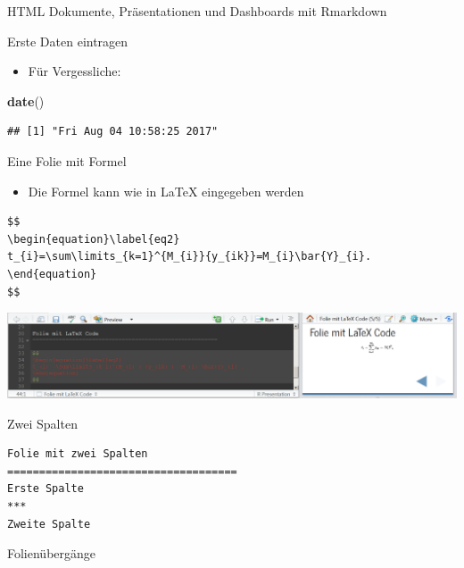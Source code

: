 \documentclass[ignorenonframetext,]{beamer}
\newenvironment{Shaded}{}{}
\newcommand{\KeywordTok}[1]{\textcolor[rgb]{0.00,0.44,0.13}{\textbf{{#1}}}}
\newcommand{\NormalTok}[1]{{#1}}
\providecommand{\tightlist}{%
\setlength{\itemsep}{0pt}\setlength{\parskip}{0pt}}
\begin{document}
\begin{frame}[fragile]{HTML Dokumente, Präsentationen und Dashboards mit
Rmarkdown}
\begin{block}{Erste Daten eintragen}

\begin{itemize}
\tightlist
\item
  Für Vergessliche:
\end{itemize}

\begin{Shaded}
\begin{Highlighting}[]
\KeywordTok{date}\NormalTok{()}
\end{Highlighting}
\end{Shaded}

\begin{verbatim}
## [1] "Fri Aug 04 10:58:25 2017"
\end{verbatim}

\end{block}

\begin{block}{Eine Folie mit Formel}

\begin{itemize}
\tightlist
\item
  Die Formel kann wie in LaTeX eingegeben werden
\end{itemize}

\begin{verbatim}
$$
\begin{equation}\label{eq2}
t_{i}=\sum\limits_{k=1}^{M_{i}}{y_{ik}}=M_{i}\bar{Y}_{i}. 
\end{equation}
$$
\end{verbatim}

\includegraphics{./tex2pdf.9796/568b92eee2895bdd9bfe25ce2cd08fe39a8df5b6.png}

\end{block}

\begin{block}{Zwei Spalten}

\begin{verbatim}
Folie mit zwei Spalten
====================================
Erste Spalte
***
Zweite Spalte
\end{verbatim}

\end{block}

\begin{block}{Folienübergänge}


\end{block}
\end{frame}
\end{document}
